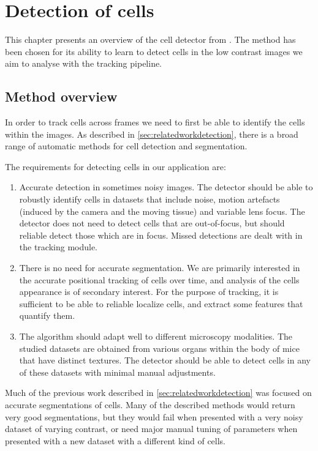 \chapter{Detection of cells \statusfirstdraft}
	\label{chap:cell_detection}
	
	
	This chapter presents an overview of the cell detector from \cite{arteta12}. The method has been chosen for its ability to learn to detect cells in the low contrast images we aim to analyse with the tracking pipeline.
	
	\section{Method overview \statusfirstdraft}
	
	In order to track cells across frames we need to first be able to identify the cells within the images. As described in \cref{sec:relatedworkdetection}, there is a broad range of automatic methods for cell detection and segmentation.
	
	The requirements for detecting cells in our application are:
		
	\begin{enumerate}
	\item Accurate detection in sometimes noisy images. The detector should be able to robustly identify cells in datasets that include noise, motion artefacts (induced by the camera and the moving tissue) and variable lens focus. The detector does not need to detect cells that are out-of-focus, but should reliable detect those which are in focus. Missed detections are dealt with in the tracking module.
	
	\item There is no need for accurate segmentation. We are primarily interested in the accurate positional tracking of cells over time, and analysis of the cells appearance is of secondary interest. For the purpose of tracking, it is sufficient to be able to reliable localize cells, and extract some features that quantify them.
	
	\item The algorithm should adapt well to different microscopy modalities. The studied datasets are obtained from various organs within the body of mice that have distinct textures. The detector should be able to detect cells in any of these datasets with minimal  manual adjustments.
	\end{enumerate}
	
	Much of the previous work described in \cref{sec:relatedworkdetection} was focused on accurate segmentations of cells. Many of the described methods would return very good segmentations, but they would fail when presented with a very noisy dataset of varying contrast, or need major manual tuning of parameters when presented with a new dataset with a different kind of cells.
	
